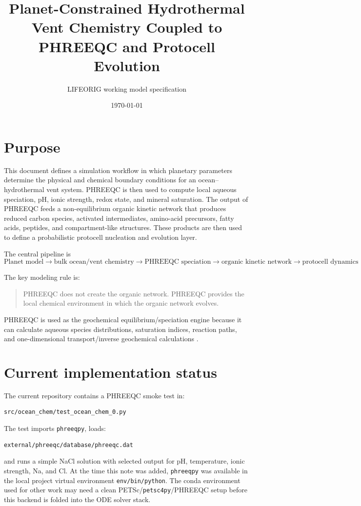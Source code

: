 \documentclass[11pt]{article}
\title{Planet-Constrained Hydrothermal Vent Chemistry Coupled to PHREEQC and Protocell Evolution}
\author{LIFEORIG working model specification}
\date{\today}
\begin{document}
\maketitle

\section{Purpose}

This document defines a simulation workflow in which planetary parameters determine the
physical and chemical boundary conditions for an ocean--hydrothermal vent system.
PHREEQC is then used to compute local aqueous speciation, pH, ionic strength, redox state,
and mineral saturation. The output of PHREEQC feeds a non-equilibrium organic kinetic
network that produces reduced carbon species, activated intermediates, amino-acid
precursors, fatty acids, peptides, and compartment-like structures. These products are then
used to define a probabilistic protocell nucleation and evolution layer.

The central pipeline is
\begin{equation}
\boxed{
\text{Planet model}
\rightarrow
\text{bulk ocean/vent chemistry}
\rightarrow
\text{PHREEQC speciation}
\rightarrow
\text{organic kinetic network}
\rightarrow
\text{protocell dynamics}
}
\end{equation}

The key modeling rule is:
\begin{quote}
PHREEQC does not create the organic network. PHREEQC provides the local chemical
environment in which the organic network evolves.
\end{quote}

PHREEQC is used as the geochemical equilibrium/speciation engine because it can calculate
aqueous species distributions, saturation indices, reaction paths, and one-dimensional
transport/inverse geochemical calculations \cite{parkhurst1995,parkhurst1999,parkhurst2013}.

\section{Current implementation status}

The current repository contains a PHREEQC smoke test in:
\begin{verbatim}
src/ocean_chem/test_ocean_chem_0.py
\end{verbatim}

The test imports \texttt{phreeqpy}, loads:
\begin{verbatim}
external/phreeqc/database/phreeqc.dat
\end{verbatim}
and runs a simple NaCl solution with selected output for pH, temperature, ionic strength,
Na, and Cl. At the time this note was added, \texttt{phreeqpy} was available in the local
project virtual environment \texttt{env/bin/python}. The conda environment used for other
work may need a clean PETSc/\texttt{petsc4py}/PHREEQC setup before this backend is folded
into the ODE solver stack.
\end{document}
